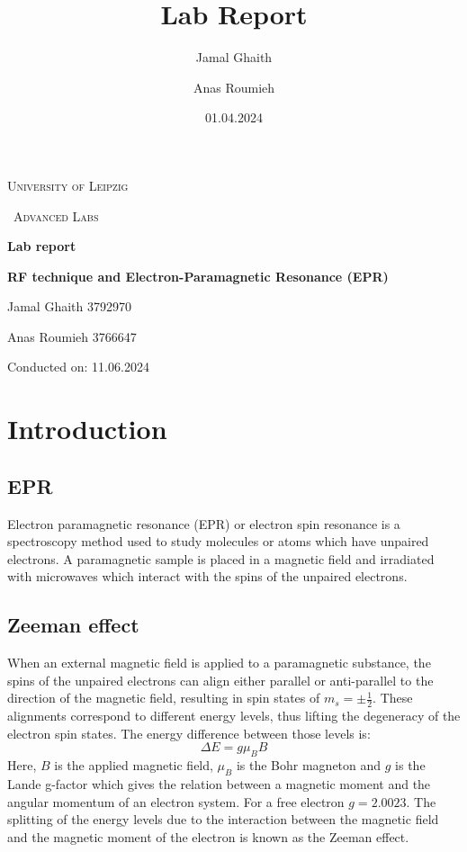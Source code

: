 \documentclass{article}
\title{Lab Report}
\author{Jamal Ghaith}
\author{Anas Roumieh}
\date{01.04.2024}
\begin{document}
\begin{titlepage}
	\centering
	{\scshape\LARGE University of Leipzig \par}
	\vspace{1cm}
	{\scshape\ Advanced Labs\par}
	\vspace{1.5cm}
	{\huge\bfseries Lab report\par}
	\vspace{2cm}
	{\huge\bfseries RF technique and Electron-Paramagnetic Resonance (EPR)\par}
	\vspace{2cm}
	{\Large Jamal Ghaith 3792970\par}
    {\Large Anas Roumieh 3766647\par}
	\vfill

    {\Large Conducted on: 11.06.2024 \par}
	\vfill
\end{titlepage}


\tableofcontents
{}
\pagebreak{}

\section{Introduction}


\subsection{EPR}
Electron paramagnetic resonance (EPR) or electron spin resonance is a spectroscopy method used to study molecules or atoms which have unpaired electrons. A paramagnetic sample is placed in a magnetic field and irradiated with microwaves which interact with the spins of the unpaired electrons. 

\subsection{Zeeman effect}
When an external magnetic field is applied to a paramagnetic substance, the spins of the unpaired electrons can align either parallel or anti-parallel to the direction of the magnetic field, resulting in spin states of $m_s = \pm \frac{1}{2}$. These alignments correspond to different energy levels, thus lifting the degeneracy of the electron spin states. The energy difference between those levels is: 
\begin{equation}
    \Delta E = g\mu_B B
\end{equation}
Here, $B$ is the applied magnetic field, $\mu_B$ is the Bohr magneton and $g$ is the Lande g-factor which gives the relation between a magnetic moment and the angular momentum of an electron system. For a free electron $g = 2.0023$. The splitting of the energy levels due to the interaction between the magnetic field and the magnetic moment of the electron is known as the Zeeman effect. 
\end{document}
